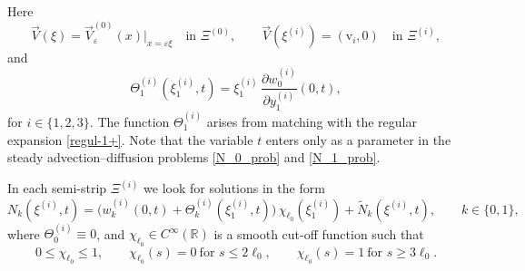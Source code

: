 \documentclass[reqno]{amsart}            %
\numberwithin{equation}{section}
\begin{document}
	Here
	\[
	\overrightarrow{V}(\xi)
	=\overrightarrow{V}^{(0)}_\varepsilon(x)\big|_{x=\varepsilon\xi}
	\quad\text{in }\Xi^{(0)},\qquad
	\overrightarrow{V}(\xi^{(i)})=(\mathrm{v}_i,0)
	\quad\text{in }\Xi^{(i)},
	\]
	and
	\begin{equation}\label{Psi_1}
		\Theta^{(i)}_1(\xi^{(i)}_1,t)
		= \xi^{(i)}_1\,\frac{\partial w_0^{(i)}}{\partial y^{(i)}_1}(0,t),
	\end{equation}
	for $i\in\{1,2,3\}$.  
	The function $\Theta^{(i)}_1$ arises from matching with the regular expansion \eqref{regul-1+}.  
	Note that the variable $t$ enters only as a parameter in the steady advection–diffusion problems \eqref{N_0_prob} and \eqref{N_1_prob}.
	
	In each semi-strip $\Xi^{(i)}$ we look for solutions in the form
	\begin{equation}\label{new-solution_k}
		N_k(\xi^{(i)},t)
		= \big(w^{(i)}_k(0,t)+\Theta^{(i)}_k(\xi^{(i)}_1,t)\big)\,\chi_{\ell_0}(\xi^{(i)}_1)
		+ \widetilde{N}_k(\xi^{(i)},t),
		\qquad k\in\{0,1\},
	\end{equation}
	where $\Theta^{(i)}_0\equiv0$, and $\chi_{\ell_0}\in C^\infty(\mathbb{R})$ is a smooth cut-off function such that  
	\[
	0\le\chi_{\ell_0}\le1,\qquad
	\chi_{\ell_0}(s)=0\ \text{for }s\le2\ell_0,\qquad
	\chi_{\ell_0}(s)=1\ \text{for }s\ge3\ell_0.
	\]
	
\end{document}
